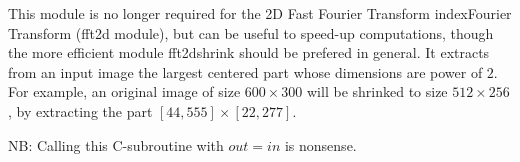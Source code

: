 This module is no longer required for the 2D Fast Fourier Transform 
index{Fourier Transform}
({\sf fft2d} module), but can be useful to speed-up computations, though
the more efficient module {\sf fft2dshrink} should be prefered in general.
It extracts from an input image the largest centered part whose dimensions 
are power of $2$.
For example, an original image of size $600 \times 300$ will be shrinked to 
size $512 \times 256$, by extracting the part $[44,555]\times [22,277]$.

\vskip 0.5cm

NB: Calling this C-subroutine with $out=in$ is nonsense.
